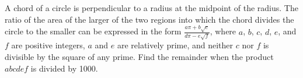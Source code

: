 A chord of a circle is perpendicular to a radius at the midpoint of the radius. The ratio of the area of the larger of the two regions into which the chord divides the circle to the smaller can be expressed in the form $\frac{a\pi+b\sqrt{c}}{d\pi-e\sqrt{f}}$, where $a$, $b$, $c$, $d$, $e$, and $f$ are positive integers, $a$ and $e$ are relatively prime, and neither $c$ nor $f$ is divisible by the square of any prime. Find the remainder when the product $abcdef$ is divided by 1000.